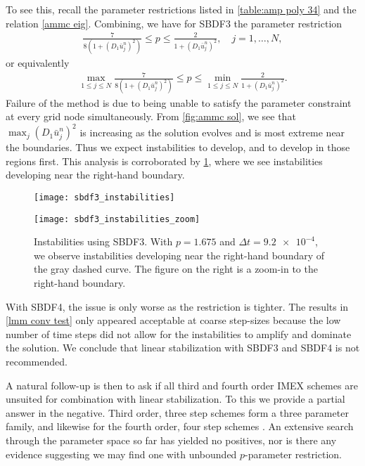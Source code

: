 To see this, recall the parameter restrictions listed in \cref{table:amp poly 34} and the relation \cref{ammc eig}. Combining, we have for SBDF3 the parameter restriction
\begin{align}
        \frac{7}{8(1 + (D_1\bar u^n_j)^2)} \leq p \leq \frac{2}{1 + (D_1 \bar u^n_j)^2},
\quad j=1,\dots,N,
\end{align}
or equivalently
\begin{align} 
\max_{1\leq j\leq N}\frac{7}{8(1 + (D_1\bar u^n_j)^2)} \leq p 
\leq \min_{1\leq j\leq N}\frac{2}{1 + (D_1 \bar u^n_j)^2}.
\end{align}
Failure of the method is due to being unable to satisfy the parameter constraint at every grid node simultaneously. From \cref{fig:ammc sol}, we see that $\max_j (D_1 \bar u^n_j)^2$ is increasing as the solution evolves and is most extreme near the boundaries. Thus we expect instabilities to develop, and to develop in those regions first. This analysis is corroborated by \cref{fig:sbdf3 instab}, where we see instabilities developing near the right-hand boundary.
\begin{figure}[htb!]
        \centering
\begin{minipage}{0.45\textwidth}
       \texttt{[image: sbdf3\_instabilities]}
\end{minipage}
\begin{minipage}{0.45\textwidth}
       \texttt{[image: sbdf3\_instabilities\_zoom]}
\end{minipage}
\caption[Instabilities using SBDF3.]{Instabilities using SBDF3. With $p=1.675$ and $\Delta t=\num{9.2e-4}$, we observe instabilities developing near the right-hand boundary of the gray dashed curve. The figure on the right is a zoom-in to the right-hand boundary.}
\label{fig:sbdf3 instab}
\end{figure}

With SBDF4, the issue is only worse as the restriction is tighter. The results in \cref{lmm conv test} only appeared acceptable at coarse step-sizes because the low number of time steps did not allow for the instabilities to amplify and dominate the solution. We conclude that linear stabilization with SBDF3 and SBDF4  is not recommended. 

A natural follow-up is then to ask if all third and fourth order IMEX schemes are unsuited for combination with linear stabilization. To this we provide a partial answer in the negative. Third order, three step schemes form a three parameter family, and likewise for the fourth order, four step schemes \cite{ascher1995implicit}. An extensive search through the parameter space so far has yielded no positives, nor is there any evidence suggesting we may find one with unbounded $p$-parameter restriction.

